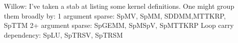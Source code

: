 \documentclass{article}
\begin{document}
Willow: I’ve taken a stab at listing some kernel definitions. One might group them broadly by:
	1 argument sparse: SpMV, SpMM, SDDMM,MTTKRP, SpTTM
	2+ argument sparse: SpGEMM, SpMSpV, SpMTTKRP
	Loop carry dependency: SpLU, SpTRSV, SpTRSM

	

\end{document}
